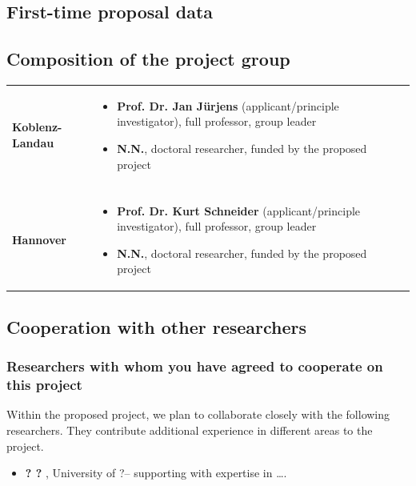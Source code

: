 \documentclass{dfg_en}
\begin{document}
\subsection{First-time proposal data}
%

\subsection{Composition of the project group}
\vspace{-5pt}
\noindent\begin{tabularx}{\textwidth}{lX}
	{\bf Koblenz-Landau}  & \vspace{-0.68cm}\begin{itemize} \setlength\itemsep{-0.4em}
		\item \textbf{Prof. Dr. Jan Jürjens} (applicant/principle investigator), full professor, group leader
		\item \textbf{N.N.}, doctoral researcher, funded by the proposed project\vspace{-0.6cm}
	\end{itemize} \\
	\\
	{\bf Hannover} & \vspace{-0.68cm}\begin{itemize} \setlength\itemsep{-0.4em}
		\item \textbf{Prof. Dr. Kurt Schneider} (applicant/principle investigator), full professor, group leader
		\item \textbf{N.N.}, doctoral researcher, funded by the proposed project\vspace{-0.6cm}
	\end{itemize}
\end{tabularx}

\subsection{Cooperation with other researchers}

\subsubsection{Researchers with whom you have agreed to cooperate on this project}
Within the proposed project, we plan to collaborate closely with the following researchers. They contribute additional experience in different areas to the project. 
\vspace{-5pt}
\begin{itemize}\setlength\itemsep{-0.4em}
	\item \textbf{? ? }, University of ?-- supporting with expertise in \ldots.
\end{itemize}
%
\end{document}
